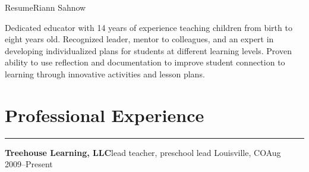 \documentclass[letterpaper,10pt]{article}
\newcommand{\mblue}{\color{darkblue}}
\begin{document}
\pagestyle{empty}

{\large\mblue Resume}\hfill{\Huge\mblue Riann Sahnow}

\vspace{2pc}
Dedicated educator with 14 years of experience teaching children from birth to eight years old. Recognized
leader, mentor to colleagues, and an expert in developing individualized plans for students at different
learning levels. Proven ability to use reflection and documentation to improve student connection to
learning through innovative activities and lesson plans.

\section*{\mblue Professional Experience}

\vspace{-2.15pc}
{\hfill\mblue\rule{4.615in}{0.02cm}}

\vspace{1pc}
\textbf{Treehouse Learning, LLC}\hfill lead teacher, preschool lead
\smallbreak Louisville, CO\hfill Aug 2009--Present
\end{document}
